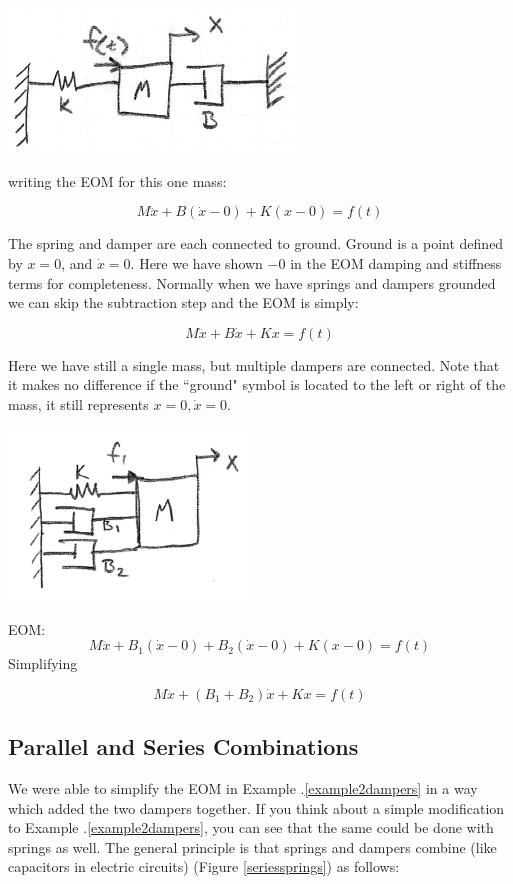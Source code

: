 \begin{ExampleSmall}

\includegraphics[width=3.0in]{figs02/00721a.png}

writing the EOM for this one mass:

\[
M\ddot{x} + B(\dot{x} - 0) + K(x-0) = f(t)
\]

The spring and damper are each connected to ground.  Ground is a point defined by $x=0$, and $\dot{x}=0$.   Here we have shown $-0$ in the EOM damping and stiffness terms for completeness.
Normally when we have springs and dampers grounded we can skip the subtraction step and the EOM is simply:

\[
M\ddot{x} + B\dot{x} + Kx = f(t)
\]

\end{ExampleSmall}





\begin{ExampleSmall}\label{example2dampers}
Here we have still a single mass, but multiple dampers are connected.   Note that it makes no difference if the ``ground" symbol is located to the left or right of the mass, it still represents $x=0, \dot{x}=0$.



\includegraphics[width=2.5in]{figs02/00722a.png}


EOM:
\[
M\ddot{x} + B_1(\dot{x}-0)+B_2(\dot{x}-0)+K(x-0) = f(t)
\]
Simplifying

\[
M\ddot{x} + (B_1+B_2)\dot{x}+Kx = f(t)
\]
\end{ExampleSmall}


\subsection{Parallel and Series Combinations}
We were able to simplify the EOM in Example \thechapter.\ref{example2dampers} in a way which added the two dampers together.   If you think about a simple modification to Example \thechapter.\ref{example2dampers}, you can see that the same could be done with springs as well.
The general principle is that springs and dampers combine (like capacitors in electric circuits) (Figure \ref{seriessprings}) as follows:

